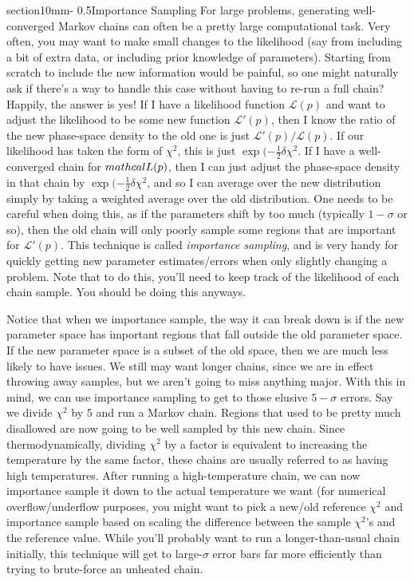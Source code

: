 \documentclass[letterpaper,11pt,preprint]{aastex}
\makeatletter
\renewcommand{\section}{\@startsection%
{section}{1}{0mm}{-\baselineskip}%
{0.5\baselineskip}{\normalfont\Large\bfseries}}%
\makeatother
\begin{document}
\section{Importance Sampling}
For large problems, generating well-converged Markov chains can often
be a pretty large computational task.  Very often, you may want to
make small changes to the likelihood (say from including a bit of
extra data, or including prior knowledge of parameters).  Starting
from scratch to include the new information would be painful, so one
might naturally ask if there's a way to handle this case without
having to re-run a full chain?  Happily, the answer is yes!  If I have
a likelihood function $\mathcal{L}(p)$ and want to adjust the
likelihood to be some new function $\mathcal{L'}(p)$, then I know the
ratio of the new phase-space density to the old one is just
$\mathcal{L'}(p)/\mathcal{L}(p)$.  If our likelihood has taken the
form of $\chi^2$, this is just $\exp(-\frac{1}{2}\delta \chi^2$.  If I
have a well-converged chain for $\\mathcal{L}(p)$, then I can just
adjust the phase-space density in that chain by
$\exp(-\frac{1}{2}\delta \chi^2$, and so I can average over the new
distribution simply by taking a weighted average over the old
distribution.  One needs to be careful when doing this, as if the
parameters shift by too much (typically $1-\sigma$ or so), then the
old chain will only poorly sample some regions that are important for
$\mathcal{L'}(p)$.  This technique is called \textit{importance
  sampling}, and is very handy for quickly getting new parameter
estimates/errors when only slightly changing a problem.  Note that to
do this, you'll need to keep track of the likelihood of each chain
sample.  You should be doing this anyways.

Notice that when we importance sample, the way it can break down is if
the new parameter space has important regions that fall outside the
old parameter space.  If the new parameter space is a subset of the
old space, then we are much less likely to have issues.  We still may
want longer chains, since we are in effect throwing away samples, but
we aren't going to miss anything major.  With this in mind, we can use
importance sampling to get to those elusive $5-\sigma$ errors.  Say we
divide $\chi^2$ by 5 and run a Markov chain.  Regions that used to be
pretty much disallowed are now going to be well sampled by this new
chain. Since thermodynamically, dividing $\chi^2$ by a factor is
equivalent to increasing the temperature by the same factor, these
chains are usually referred to as having high temperatures.  After
running a high-temperature chain, we can now importance sample it down
to the actual temperature we want (for numerical overflow/underflow
purposes, you might want to pick a new/old reference $\chi^2$ and
importance sample based on scaling the difference between the sample
$\chi^2$'s and the reference value.  While you'll probably want to run
a longer-than-usual chain initially, this technique will get to
large-$\sigma$ error bars far more efficiently than trying to
brute-force an unheated chain.
\end{document}
